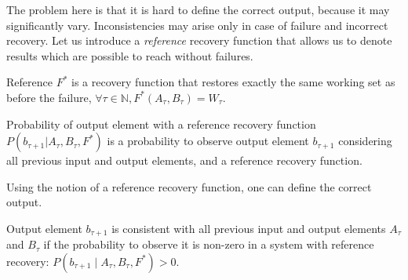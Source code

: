 The problem here is that it is hard to define the correct output, because it may significantly vary. Inconsistencies may arise only in case of failure and incorrect recovery. Let us introduce a {\em reference} recovery function that allows us to denote results which are possible to reach without failures.

\begin{definition}{Reference}
$F^{*}$ is a recovery function that restores exactly the same working set as before the failure, $\forall \tau \in \mathbb{N}, F^{*}(A_\tau,B_\tau)=W_\tau$.
\end{definition}

\begin{definition}{Probability of output element with a reference recovery function}
$P(b_{\tau+1}|A_{\tau}, B_\tau, F^{*})$ is a probability to observe output element $b_{\tau+1}$ considering all previous input and output elements, and a reference recovery function.
\end{definition}

Using the notion of a reference recovery function, one can define the correct output. 

\begin{definition}{Output element $b_{\tau+1}$ is consistent}
with all previous input and output elements $A_\tau$ and $B_\tau$ if the probability to observe it is non-zero in a system with reference recovery: $P(b_{\tau+1} \mid A_\tau,B_\tau,F^{*})>0$.
\end{definition}

